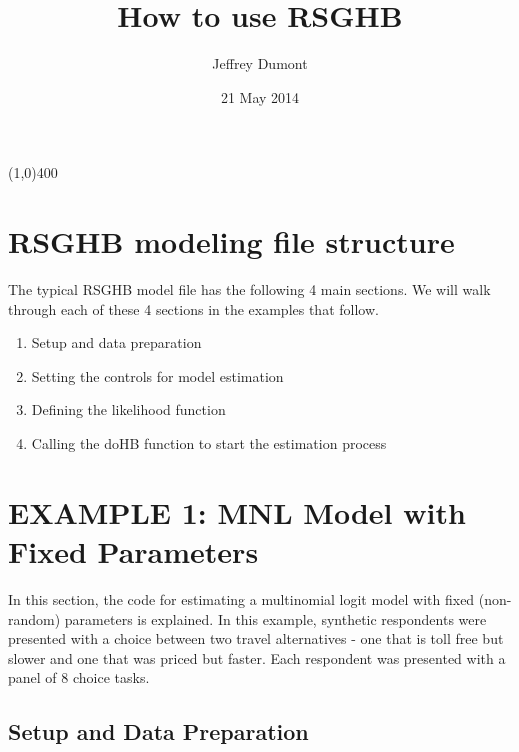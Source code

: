 \documentclass{article}\usepackage[]{graphicx}\usepackage[]{color}
\begin{document}
\title{How to use RSGHB}
\author{Jeffrey Dumont}
\date{21 May 2014}
\maketitle
{}

\begin{center}
\line(1,0){400}
\end{center}

\section*{RSGHB modeling file structure}

The typical RSGHB model file has the following 4 main sections. We will walk through each of these 4 sections in the examples that follow.

\begin{enumerate}
     \item Setup and data preparation
     \item Setting the controls for model estimation
     \item Defining the likelihood function
     \item Calling the doHB function to start the estimation process
\end{enumerate}

\section*{EXAMPLE 1: MNL Model with Fixed Parameters}

In this section, the code for estimating a multinomial logit model with fixed (non-random) parameters is explained. In this example, synthetic respondents were presented with a choice between two travel alternatives - one that is toll free but slower and one that was priced but faster. Each respondent was presented with a panel of 8 choice tasks.

\subsection*{Setup and Data Preparation}
\end{document}
